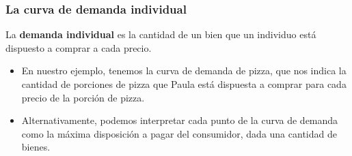 \documentclass{beamer}
\begin{document}
\begin{frame}
\frametitle{La curva de demanda individual}
    \begin{boxB}
    \begin{center}
    La \textbf{demanda individual} es la cantidad de un bien que un individuo está dispuesto a comprar a cada precio.
    \end{center}
    \end{boxB}
    \begin{itemize}
    \item En nuestro ejemplo, tenemos la curva de demanda de pizza, que nos indica la cantidad de porciones de pizza que Paula está dispuesta a comprar para cada precio de la porción de pizza. \vspace{3mm}
    \item Alternativamente, podemos interpretar cada punto de la curva de demanda como la máxima disposición a pagar del consumidor, dada una cantidad de bienes.
    \end{itemize}
\end{frame}
\end{document}
